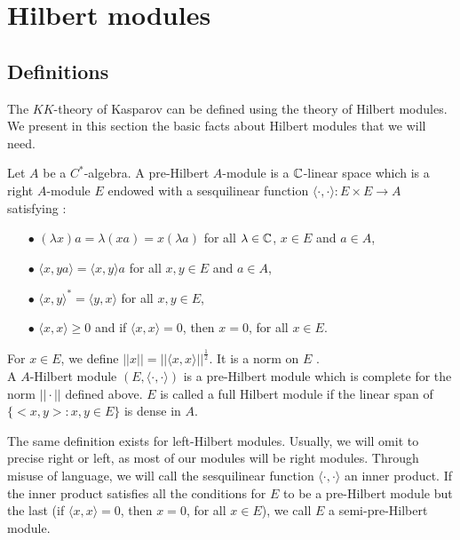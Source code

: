 \section{Hilbert modules}

\subsection{Definitions}

The $KK$-theory of Kasparov can be defined using the theory of Hilbert modules. We present in this section the basic facts about Hilbert modules that we will need.

\begin{definition}
Let $A$ be a $C^*$-algebra. A pre-Hilbert $A$-module is a $\mathbb C$-linear space which is a right $A$-module $E$ endowed with a sesquilinear function $\langle\cdot, \cdot \rangle : E\times E \rightarrow A$ satisfying :
\begin{itemize}
\item[$\bullet$] $(\lambda x)a = \lambda (xa) = x(\lambda a)$ for all $\lambda\in\mathbb C$, $x\in E$ and $a\in A$,
\item[$\bullet$] $\langle x, ya\rangle = \langle x,y\rangle a $ for all $x,y\in E$ and $a\in A$,
\item[$\bullet$] $\langle x,y\rangle^* = \langle y,x\rangle$ for all $x,y\in E$,
\item[$\bullet$] $\langle x ,x\rangle \geq 0 $ and if $\langle x,x\rangle = 0$, then $x=0$, for all $x\in E$.
\end{itemize}
For $x\in E$, we define $||x|| = ||\langle x,x\rangle ||^{\frac{1}{2}}$. It is a norm on $E$ \cite{Lance}.\\

A $A$-Hilbert module $(E,\langle \cdot,\cdot \rangle)$ is a pre-Hilbert module which is complete for the norm $||\cdot ||$ defined above. $E$ is called a full Hilbert module if the linear span of $\{ <x,y> : x,y\in E\}$ is dense in $A$.
\end{definition}

The same definition exists for left-Hilbert modules. Usually, we will omit to precise right or left, as most of our modules will be right modules. Through misuse of language, we will call the sesquilinear function $\langle \cdot,\cdot \rangle$ an inner product. If the inner product satisfies all the conditions for $E$ to be a pre-Hilbert module but the last (if $\langle x,x\rangle = 0$, then $x=0$, for all $x\in E$), we call $E$ a semi-pre-Hilbert module.

